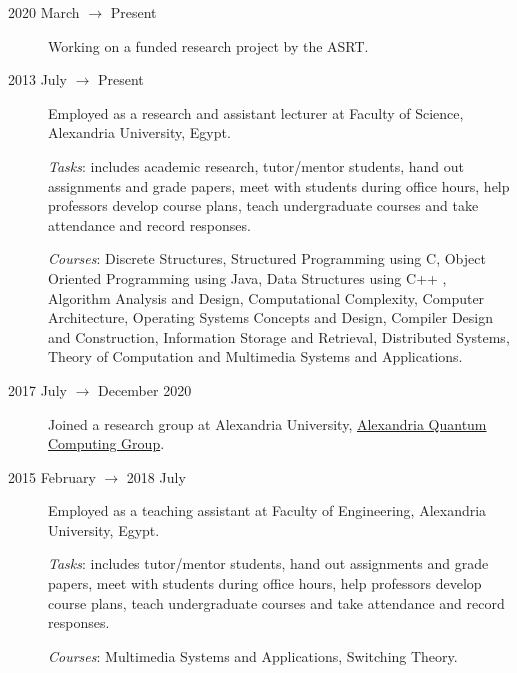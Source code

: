 \documentclass[margin,line,a4paper]{resume}
\begin{document}
\begin{resume}
\begin{description}
    \item[2020 March $\rightarrow$ Present] Working on a funded research project by the ASRT.

    
    \item[2013 July $\rightarrow$ Present] Employed as a research and assistant lecturer at Faculty of Science, Alexandria University, Egypt. 
    
    \emph{Tasks}: includes academic research, tutor/mentor students, hand out assignments and grade papers, meet with students during office hours, help professors develop course plans, teach undergraduate courses and take attendance and record responses.
       
    \emph{Courses}: Discrete Structures, Structured Programming using C, Object Oriented Programming using Java, Data Structures using C++ , Algorithm Analysis and Design, Computational Complexity, Computer Architecture, Operating Systems Concepts and Design, Compiler Design and Construction, Information Storage and Retrieval, Distributed Systems, Theory of Computation and Multimedia Systems and Applications.
    
        
	\item[2017 July $\rightarrow$ December 2020 ]  Joined a research group at Alexandria University, \href{http://www.sci.p.alexu.edu.eg/~aleqcg/index.html}{Alexandria Quantum Computing Group}.
    

        

	\item[2015 February $\rightarrow$ 2018 July] Employed as a teaching assistant at Faculty of Engineering, Alexandria University, Egypt. 
	
	\emph{Tasks}: includes tutor/mentor students, hand out assignments and grade papers, meet with students during office hours, help professors develop course plans, teach undergraduate courses and take attendance and record responses.        
    
	\emph{Courses}: Multimedia Systems and Applications, Switching Theory.
    
 
    



\end{description}
\end{resume}
\end{document}
